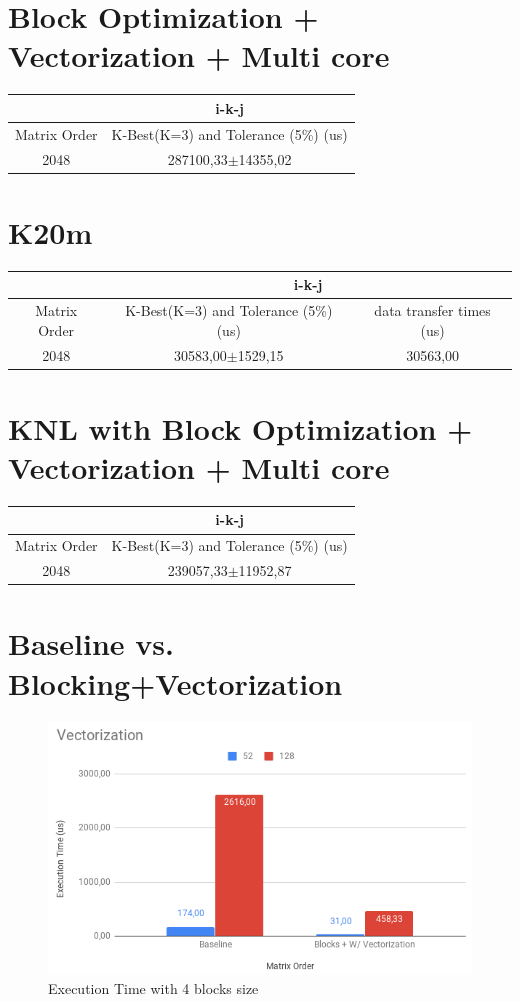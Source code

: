 \documentclass{article}
\begin{document}
\begin{appendices}
\section{Block Optimization + Vectorization + Multi core}
\begin{tabular}{|c|c|}
\hline
              & i-k-j \\
\hline
Matrix Order  & K-Best(K=3) and Tolerance (5\%) (us)  \\ 
\hline \hline
 2048         & 287100,33$\pm$14355,02 \\
\hline
\end{tabular}

\section{K20m}
\label{kepler_k20m}
\begin{tabular}{|c|c|c|}
\hline
              & \multicolumn{2}{|c|}{i-k-j} \\
\hline
Matrix Order  & K-Best(K=3) and Tolerance (5\%) (us) & data transfer times (us)  \\ 
\hline \hline
 2048         & 30583,00$\pm$1529,15 & 30563,00 \\
\hline
\end{tabular}

\section{KNL with Block Optimization + Vectorization + Multi core}

\begin{tabular}{|c|c|}
\hline
              & i-k-j \\
\hline
Matrix Order  & K-Best(K=3) and Tolerance (5\%) (us)  \\ 
\hline \hline
 2048         & 239057,33$\pm$11952,87 \\
\hline
\end{tabular}

\section{Baseline vs. Blocking+Vectorization}
\begin{figure}[H]
    \centering
    \includegraphics[width=15cm]{Pictures/exeTimeVec.png}
    \caption{Execution Time with 4 blocks size}
    \label{fig:exeTimeVec}
\end{figure}


\end{appendices}
\end{document}
